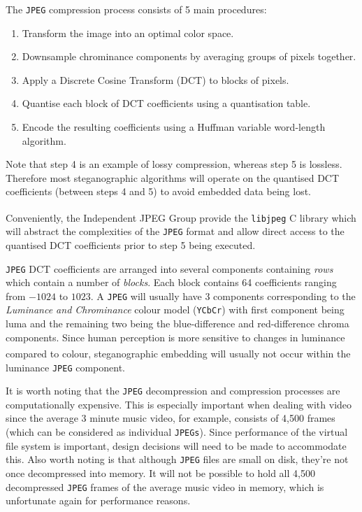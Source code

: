 \documentclass[paper=a4, fontsize=11pt,twoside]{scrartcl}
\numberwithin{table}{section}
\numberwithin{figure}{section}
\numberwithin{algorithm}{section}
\begin{document}
The \texttt{JPEG} compression process consists of 5 main procedures:
\begin{enumerate}
	\item Transform the image into an optimal color space. 
	\item Downsample chrominance components by averaging groups of pixels together.
	\item Apply a Discrete Cosine Transform (DCT) to blocks of pixels. 
	\item Quantise each block of DCT coefficients using a quantisation table. 
	\item Encode the resulting coefficients using a Huffman variable word-length algorithm. 
\end{enumerate}

\noindent
Note that step 4 is an example of lossy compression, whereas step 5 is lossless. Therefore most steganographic algorithms will operate on the quantised DCT coefficients (between steps 4 and 5) to avoid embedded data being lost.

Conveniently, the Independent JPEG Group provide the \texttt{libjpeg} C library\textsuperscript{\cite{libjpeg}} which will abstract the complexities of the \texttt{JPEG} format and allow direct access to the quantised DCT coefficients prior to step 5 being executed.

\texttt{JPEG} DCT coefficients are arranged into several components containing \textit{rows} which contain a number of \textit{blocks}. Each block contains 64 coefficients ranging from $-1024$ to $1023$. A \texttt{JPEG} will usually have 3 components corresponding to the \textit{Luminance and Chrominance} colour model (\texttt{YCbCr}) with first component being luma and the remaining two being the blue-difference and red-difference chroma components. Since human perception is more sensitive to changes in luminance compared to colour\textsuperscript{\cite{sensitive}}, steganographic embedding will usually not occur within the luminance \texttt{JPEG} component.

It is worth noting that the \texttt{JPEG} decompression and compression processes are computationally expensive. This is especially important when dealing with video since the average 3 minute music video, for example, consists of 4,500 frames (which can be considered as individual \texttt{JPEGs}). Since performance of the virtual file system is important, design decisions will need to be made to accommodate this. Also worth noting is that although \texttt{JPEG} files are small on disk, they're not once decompressed into memory. It will not be possible to hold all 4,500 decompressed \texttt{JPEG} frames of the average music video in memory, which is unfortunate again for performance reasons.
\end{document}
